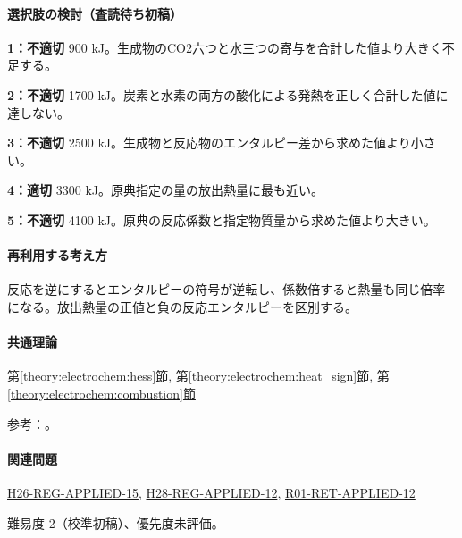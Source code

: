 \paragraph{選択肢の検討（査読待ち初稿）}\mbox{}\par

\noindent\textbf{1：不適切} 900 kJ。生成物のCO2六つと水三つの寄与を合計した値より大きく不足する。\par

\noindent\textbf{2：不適切} 1700 kJ。炭素と水素の両方の酸化による発熱を正しく合計した値に達しない。\par

\noindent\textbf{3：不適切} 2500 kJ。生成物と反応物のエンタルピー差から求めた値より小さい。\par

\noindent\textbf{4：適切} 3300 kJ。原典指定の量の放出熱量に最も近い。\par

\noindent\textbf{5：不適切} 4100 kJ。原典の反応係数と指定物質量から求めた値より大きい。\par

\paragraph{再利用する考え方} 反応を逆にするとエンタルピーの符号が逆転し、係数倍すると熱量も同じ倍率になる。放出熱量の正値と負の反応エンタルピーを区別する。

\paragraph{共通理論} \hyperref[theory:electrochem:hess]{第\ref*{theory:electrochem:hess}節}, \hyperref[theory:electrochem:heat_sign]{第\ref*{theory:electrochem:heat_sign}節}, \hyperref[theory:electrochem:combustion]{第\ref*{theory:electrochem:combustion}節}

\par 参考：\cite{openstax_hess}。

\paragraph{関連問題} \hyperref[q:h26-reg-applied-15]{H26-REG-APPLIED-15}, \hyperref[q:h28-reg-applied-12]{H28-REG-APPLIED-12}, \hyperref[q:r01-ret-applied-12]{R01-RET-APPLIED-12}

\par 難易度 2（校準初稿）、優先度未評価。

